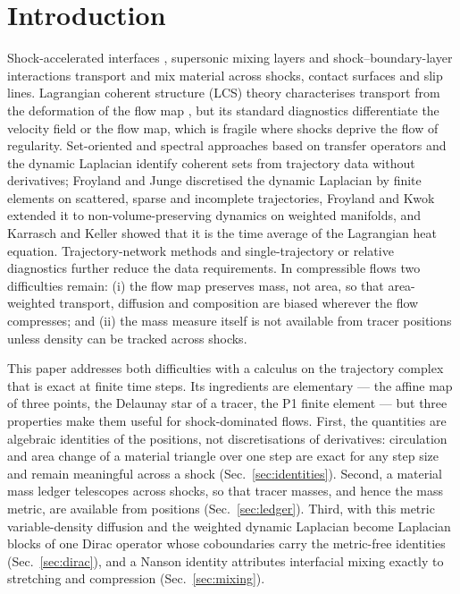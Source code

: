 \documentclass[11pt]{article}
\theoremstyle{definition}\newtheorem{definition}{Definition}\theoremstyle{remark}\newtheorem{remark}{Remark}
\begin{document}
\section{Introduction}
Shock-accelerated interfaces \citep{HaasSturtevant1987,PiconeBoris1988,SamtaneyZabusky1994}, supersonic mixing layers and shock--boundary-layer interactions transport and mix material across shocks, contact surfaces and slip lines. Lagrangian coherent structure (LCS) theory characterises transport from the deformation of the flow map \citep{Haller2015,Hadjighasem2017}, but its standard diagnostics differentiate the velocity field or the flow map, which is fragile where shocks deprive the flow of regularity. Set-oriented and spectral approaches based on transfer operators and the dynamic Laplacian \citep{Froyland2015} identify coherent sets from trajectory data without derivatives; Froyland and Junge \citep{FroylandJunge2018} discretised the dynamic Laplacian by finite elements on scattered, sparse and incomplete trajectories, Froyland and Kwok \citep{FroylandKwok2020} extended it to non-volume-preserving dynamics on weighted manifolds, and Karrasch and Keller \citep{KarraschKeller2020} showed that it is the time average of the Lagrangian heat equation. Trajectory-network methods \citep{Iacobello2021,PadbergGehle2017,BanischKoltai2017} and single-trajectory or relative diagnostics \citep{Haller2021,Aksamit2024} further reduce the data requirements. In compressible flows two difficulties remain: (i) the flow map preserves mass, not area, so that area-weighted transport, diffusion and composition are biased wherever the flow compresses; and (ii) the mass measure itself is not available from tracer positions unless density can be tracked across shocks.

This paper addresses both difficulties with a calculus on the trajectory complex that is exact at finite time steps. Its ingredients are elementary --- the affine map of three points, the Delaunay star of a tracer, the P1 finite element --- but three properties make them useful for shock-dominated flows. First, the quantities are algebraic identities of the positions, not discretisations of derivatives: circulation and area change of a material triangle over one step are exact for any step size and remain meaningful across a shock (Sec.~\ref{sec:identities}). Second, a material mass ledger telescopes across shocks, so that tracer masses, and hence the mass metric, are available from positions (Sec.~\ref{sec:ledger}). Third, with this metric variable-density diffusion and the weighted dynamic Laplacian become Laplacian blocks of one Dirac operator whose coboundaries carry the metric-free identities (Sec.~\ref{sec:dirac}), and a Nanson identity attributes interfacial mixing exactly to stretching and compression (Sec.~\ref{sec:mixing}).
\end{document}
